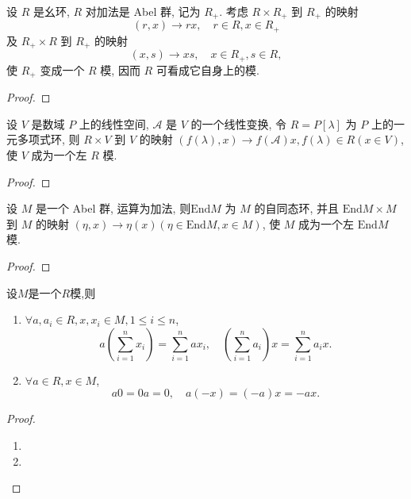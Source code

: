 \documentclass[../../main.tex]{subfiles}
\begin{document}
\begin{example}
设 \( R \) 是幺环, \( R \) 对加法是 Abel 群, 记为 \( R_+ \). 考虑 \( R \times R_+ \) 到 \( R_+ \) 的映射
\[
(r,x) \to rx, \quad r \in R, x \in R_+
\]
及 \( R_+ \times R \) 到 \( R_+ \) 的映射
\[
(x,s) \to xs, \quad x \in R_+, s \in R,
\]
使 \( R_+ \) 变成一个 \( R \) 模, 因而 \( R \) 可看成它自身上的模.
\end{example}
\begin{proof}

\end{proof}

\begin{example}\label{example:抽象代数-例题1.6.4}
设 \( V \) 是数域 \( P \) 上的线性空间, \( \mathcal{A} \) 是 \( V \) 的一个线性变换, 令 \( R = P[\lambda] \) 为 \( P \) 上的一元多项式环, 则 \( R \times V \) 到 \( V \) 的映射 \( (f(\lambda),x) \to f(\mathcal{A})x, f(\lambda) \in R (x \in V) \), 使 \( V \) 成为一个左 \( R \) 模.
\end{example}
\begin{proof}

\end{proof}

\begin{example}
设 \( M \) 是一个 Abel 群, 运算为加法, 则\( \text{End}M \) 为 \( M \) 的自同态环, 并且 \( \text{End}M \times M \) 到 \( M \) 的映射 \( (\eta,x) \to \eta(x) (\eta \in \text{End}M, x \in M) \), 使 \( M \) 成为一个左 \( \text{End}M \) 模.
\end{example}
\begin{proof}

\end{proof}

\begin{theorem}
设$M$是一个$R$模,则
\begin{enumerate}[(1)]
\item  \( \forall a,a_i \in R, x,x_i \in M, 1 \leqslant i \leqslant n \),
\[
a\left( \sum_{i=1}^n x_i \right) = \sum_{i=1}^n ax_i, \quad \left( \sum_{i=1}^n a_i \right) x = \sum_{i=1}^n a_i x.
\]

\item \( \forall a \in R, x \in M \),
\[
a0 = 0a = 0, \quad a(-x) = (-a)x = -ax.
\]
\end{enumerate}
\end{theorem}
\begin{proof}
\begin{enumerate}[(1)]
\item 

\item 
\end{enumerate}
\end{proof}
\end{document}
